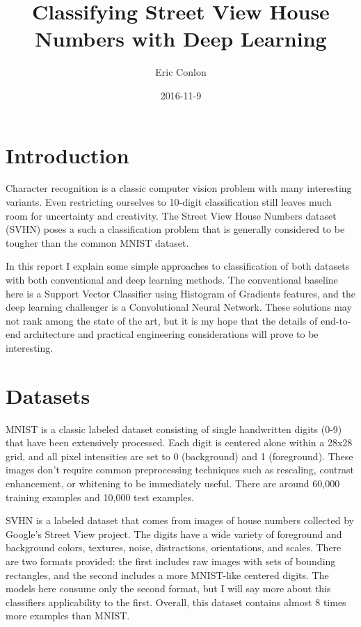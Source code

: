 \documentclass{article}
\begin{document}
\author{Eric Conlon}
\title{Classifying Street View House Numbers with Deep Learning}
\date{2016-11-9}

\maketitle{} %

\tableofcontents{} %

\section{Introduction}

Character recognition is a classic computer vision problem with many interesting variants. Even restricting ourselves to 10-digit classification still leaves much room for uncertainty and creativity. The Street View House Numbers dataset (SVHN) poses a such a classification problem that is generally considered to be tougher than the common MNIST dataset.

In this report I explain some simple approaches to classification of both datasets with both conventional and deep learning methods. The conventional baseline here is a Support Vector Classifier using Histogram of Gradients features, and the deep learning challenger is a Convolutional Neural Network. These solutions may not rank among the state of the art, but it is my hope that the details of end-to-end architecture and practical engineering considerations will prove to be interesting.

\section{Datasets}

MNIST is a classic labeled dataset consisting of single handwritten digits (0-9) that have been extensively processed. Each digit is centered alone within a 28x28 grid, and all pixel intensities are set to 0 (background) and 1 (foreground). These images don't require common preprocessing techniques such as rescaling, contrast enhancement, or whitening to be immediately useful. There are around 60,000 training examples and 10,000 test examples.

SVHN is a labeled dataset that comes from images of house numbers collected by Google's Street View project. The digits have a wide variety of foreground and background colors, textures, noise, distractions, orientations, and scales. There are two formats provided: the first includes raw images with sets of bounding rectangles, and the second includes a more MNIST-like centered digits. The models here consume only the second format, but I will say more about this classifiers applicability to the first. Overall, this dataset contains almost 8 times more examples than MNIST.
\end{document}
